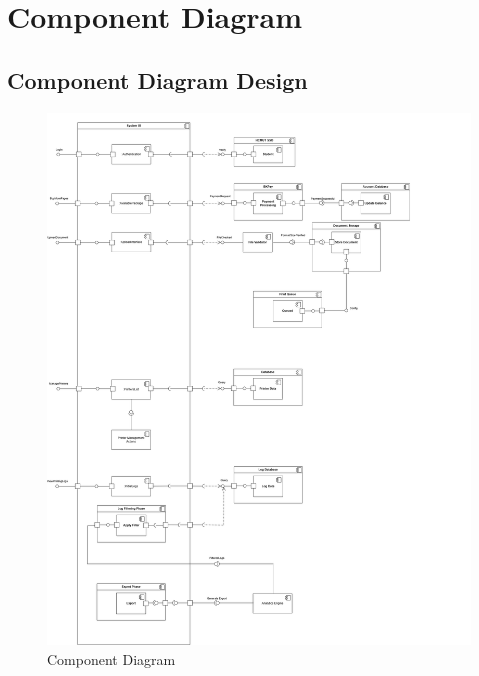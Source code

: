 \documentclass[a4paper]{report}
\begin{document}
\newpage
\section{Component Diagram}
\subsection{Component Diagram Design}
\begin{figure}[H]
    \centering
    \includegraphics[width=1\linewidth]{images/component_diagram.png}
    \caption{Component Diagram}
    \label{fig:enter-label}
\end{figure}

\newpage
\end{document}
